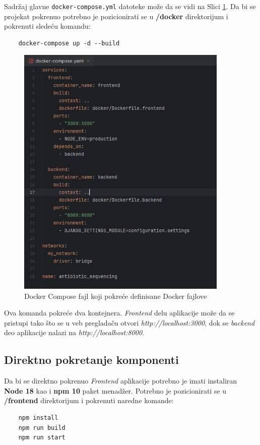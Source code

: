 \documentclass[12pt,oneside]{memoir}
\begin{document}
Sadržaj glavne \texttt{docker-compose.yml} datoteke može da se vidi na Slici \ref{fig:docker_compose}. Da bi se projekat pokrenuo potrebno je pozicionirati se u \textbf{/docker} direktorijum i pokrenuti sledeću komandu:
\begin{verbatim}
    docker-compose up -d --build
\end{verbatim}

\begin{figure}[h]
\centering
\includegraphics[width=0.9\textwidth]{images/docker_compose.png}
\caption{Docker Compose fajl koji pokreće definisane Docker fajlove}
\label{fig:docker_compose}
\end{figure}


Ova komanda pokreće dva kontejnera. \emph{Frontend} delu aplikacije može da se pristupi tako što se u veb pregladaču otvori \emph{http://localhost:3000}, dok se \emph{backend} deo aplikacije nalazi na \emph{http://localhost:8000}.

\subsection{Direktno pokretanje komponenti}

Da bi se direktno pokrenuo \emph{Frontend} aplikacije potrebno je imati instaliran \textbf{Node 18} kao i \textbf{npm 10} paket menadžer. Potrebno je pozicionirati se u \textbf{/frontend} direktorijum i pokrenuti naredne komande:
\begin{verbatim}
    npm install
    npm run build
    npm run start
\end{verbatim}
\end{document}
